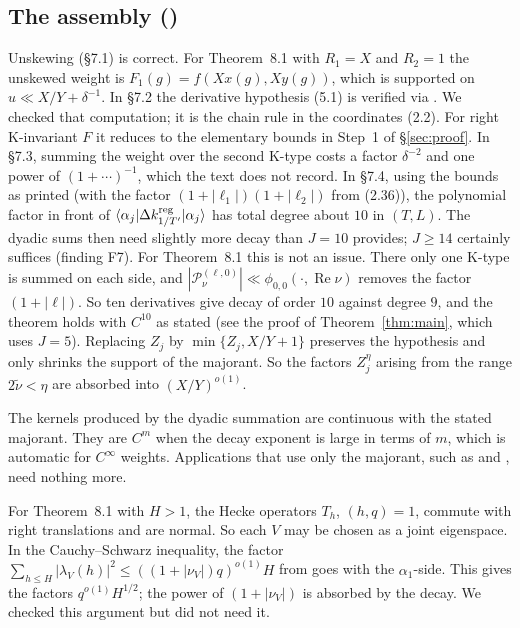 \documentclass[11pt]{amsart}
\theoremstyle{remark}
\theoremstyle{definition}
\numberwithin{equation}{section}
\newcommand{\K}{\mathrm{K}}
\newcommand{\br}[1]{\langle #1\rangle}
\newcommand{\Pc}{\mathcal{P}}
\begin{document}
\subsection{The assembly (\texorpdfstring{\cite[\S\S7--8]{GM1}}{[GM1, §§7--8]})}\label{sec:assembly}
Unskewing (\S7.1) is correct. For Theorem~8.1 with $R_1=X$ and $R_2=1$ the unskewed weight is $F_1(g)=f(Xx(g),Xy(g))$, which is supported on $u\ll X/Y+\delta^{-1}$. In \S7.2 the derivative hypothesis (5.1) is verified via \cite[\S7.3]{GM0}. We checked that computation; it is the chain rule in the coordinates (2.2). For right $\K$-invariant $F$ it reduces to the elementary bounds in Step~1 of \S\ref{sec:proof}. In \S7.3, summing the weight over the second $\K$-type costs a factor $\delta^{-2}$ and one power of $(1+\cdots)^{-1}$, which the text does not record. In \S7.4, using the bounds as printed (with the factor $(1+|\ell_1|)(1+|\ell_2|)$ from (2.36)), the polynomial factor in front of $\br{\alpha_j|\Delta k^{\rm reg}_{1/T'}|\alpha_j}$ has total degree about $10$ in $(T,L)$. The dyadic sums then need slightly more decay than $J=10$ provides; $J\ge14$ certainly suffices (finding F7). For Theorem~8.1 this is not an issue. There only one $\K$-type is summed on each side, and $|\Pc^{(\ell,0)}_\nu|\ll\phi_{0,0}(\cdot,\operatorname{Re}\nu)$ removes the factor $(1+|\ell|)$. So ten derivatives give decay of order $10$ against degree $9$, and the theorem holds with $C^{10}$ as stated (see the proof of Theorem~\ref{thm:main}, which uses $J=5$). Replacing $Z_j$ by $\min\{Z_j,X/Y+1\}$ preserves the hypothesis and only shrinks the support of the majorant. So the factors $Z_j^\eta$ arising from the range $2\tilde\nu<\eta$ are absorbed into $(X/Y)^{o(1)}$.

The kernels produced by the dyadic summation are continuous with the stated majorant. They are $C^m$ when the decay exponent is large in terms of $m$, which is automatic for $C^\infty$ weights. Applications that use only the majorant, such as \cite{GM2} and \cite{II}, need nothing more.

For Theorem~8.1 with $H>1$, the Hecke operators $T_h$, $(h,q)=1$, commute with right translations and are normal. So each $V$ may be chosen as a joint eigenspace. In the Cauchy--Schwarz inequality, the factor $\sum_{h\le H}|\lambda_V(h)|^2\le((1+|\nu_V|)q)^{o(1)}H$ from \cite[(2.25)]{GM1} goes with the $\alpha_1$-side. This gives the factors $q^{o(1)}H^{1/2}$; the power of $(1+|\nu_V|)$ is absorbed by the decay. We checked this argument but did not need it.
\end{document}
